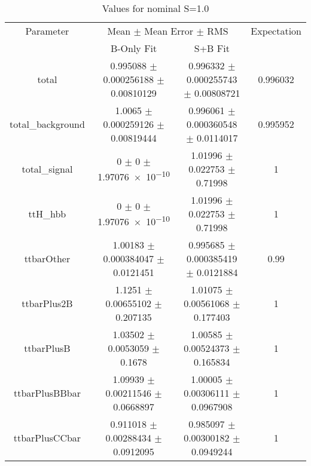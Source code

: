 \begin{table}
\centering
\caption{Values for nominal S=1.0}
\begin{tabular}{cccc}
\toprule
Parameter & \multicolumn{2}{c}{Mean $\pm$ Mean Error $\pm$ RMS} & Expectation\\
 & B-Only Fit & S+B Fit & \\
\midrule
total & \num{0.995088} $\pm$ \num{0.000256188} $\pm$ \num{0.00810129} & \num{0.996332} $\pm$ \num{0.000255743} $\pm$ \num{0.00808721} & \num{0.996032}\\
total\_background & \num{1.0065} $\pm$ \num{0.000259126} $\pm$ \num{0.00819444} & \num{0.996061} $\pm$ \num{0.000360548} $\pm$ \num{0.0114017} & \num{0.995952}\\
total\_signal & \num{0} $\pm$ \num{0} $\pm$ \num{1.97076e-10} & \num{1.01996} $\pm$ \num{0.022753} $\pm$ \num{0.71998} & \num{1}\\
ttH\_hbb & \num{0} $\pm$ \num{0} $\pm$ \num{1.97076e-10} & \num{1.01996} $\pm$ \num{0.022753} $\pm$ \num{0.71998} & \num{1}\\
ttbarOther & \num{1.00183} $\pm$ \num{0.000384047} $\pm$ \num{0.0121451} & \num{0.995685} $\pm$ \num{0.000385419} $\pm$ \num{0.0121884} & \num{0.99}\\
ttbarPlus2B & \num{1.1251} $\pm$ \num{0.00655102} $\pm$ \num{0.207135} & \num{1.01075} $\pm$ \num{0.00561068} $\pm$ \num{0.177403} & \num{1}\\
ttbarPlusB & \num{1.03502} $\pm$ \num{0.0053059} $\pm$ \num{0.1678} & \num{1.00585} $\pm$ \num{0.00524373} $\pm$ \num{0.165834} & \num{1}\\
ttbarPlusBBbar & \num{1.09939} $\pm$ \num{0.00211546} $\pm$ \num{0.0668897} & \num{1.00005} $\pm$ \num{0.00306111} $\pm$ \num{0.0967908} & \num{1}\\
ttbarPlusCCbar & \num{0.911018} $\pm$ \num{0.00288434} $\pm$ \num{0.0912095} & \num{0.985097} $\pm$ \num{0.00300182} $\pm$ \num{0.0949244} & \num{1}\\
\bottomrule
\end{tabular}
\end{table}
